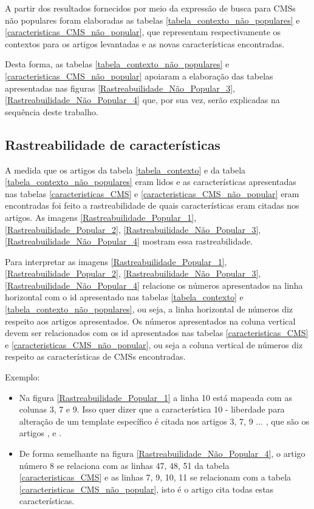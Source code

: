 A partir dos resultados fornecidos por meio da expressão de busca para CMSs não populares foram elaboradas as tabelas \ref{tabela_contexto_não_populares} e \ref{caracteristicas_CMS_não_popular}, que representam respectivamente os contextos para os artigos levantadas e as novas características encontradas.
 
Desta forma, as tabelas \ref{tabela_contexto_não_populares} e \ref{caracteristicas_CMS_não_popular} apoiaram a elaboração das tabelas apresentadas nas figuras  \ref{Rastreabuilidade_Não_Popular_3}, \ref{Rastreabuilidade_Não_Popular_4} que, por sua vez, serão explicadas na sequência deste trabalho.


\subsection{Rastreabilidade de características}
\label{rastreio}

A medida que os artigos da tabela \ref{tabela_contexto} e da tabela \ref{tabela_contexto_não_populares} eram lidos e as características apresentadas nas tabelas \ref{caracteristicas_CMS} e \ref{caracteristicas_CMS_não_popular} eram encontradas foi feito a rastreabilidade de quais características eram citadas nos artigos. As imagens \ref{Rastreabuilidade_Popular_1}, \ref{Rastreabuilidade_Popular_2}, \ref{Rastreabuilidade_Não_Popular_3}, \ref{Rastreabuilidade_Não_Popular_4} mostram essa rastreabilidade.

Para interpretar as imagens \ref{Rastreabuilidade_Popular_1},  \ref{Rastreabuilidade_Popular_2}, \ref{Rastreabuilidade_Não_Popular_3}, \ref{Rastreabuilidade_Não_Popular_4} relacione os números apresentados na linha horizontal com o id apresentado nas tabelas \ref{tabela_contexto} e \ref{tabela_contexto_não_populares}, ou seja, a linha horizontal de números diz respeito aos artigos apresentados. Os números apresentados na coluna vertical devem ser relacionados com os id apresentados nas tabelas \ref{caracteristicas_CMS} e \ref{caracteristicas_CMS_não_popular}, ou seja a coluna vertical de números diz respeito as características de CMSs encontradas.

Exemplo:

\begin{itemize}
\item Na figura \ref{Rastreabuilidade_Popular_1} a linha 10 está mapeada com as colunas 3, 7 e 9. Isso quer dizer que a característica 10 - liberdade para alteração de um template específico é citada nos artigos 3, 7, 9 ... , que são os artigos  ,  e .

\item De forma semelhante na figura \ref{Rastreabuilidade_Não_Popular_4}, o artigo número 8 se relaciona com as linhas 47, 48, 51 da tabela \ref{caracteristicas_CMS} e as linhas 7, 9, 10, 11 se relacionam com a tabela \ref{caracteristicas_CMS_não_popular}, isto é o artigo  cita todas estas características.

\end{itemize}

